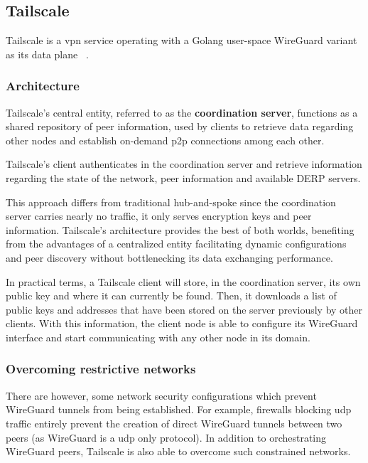 \documentclass[11pt,twoside,a4paper]{report}
\begin{document}
\subsection{Tailscale}

Tailscale is a \ac{vpn} service operating with a Golang user-space WireGuard variant as its data plane ~\cite{tailscale2020online}.

\subsubsection{Architecture}

Tailscale's central entity, referred to as the \textbf{coordination server}, functions as a shared repository of peer information, used by clients to retrieve data regarding other nodes and establish on-demand \ac{p2p} connections among each other.

Tailscale's client authenticates in the coordination server and retrieve information regarding the state of the network, peer information and available \ac{DERP} servers.

This approach differs from traditional hub-and-spoke since the coordination server carries nearly no traffic, it only serves encryption keys and peer information. Tailscale's architecture provides the best of both worlds, benefiting from the advantages of a centralized entity facilitating dynamic configurations and peer discovery without bottlenecking its data exchanging performance.

In practical terms, a Tailscale client will store, in the coordination server, its own public key and where it can currently be found. Then, it downloads a list of public keys and addresses that have been stored on the server previously by other clients. With this information, the client node is able to configure its WireGuard interface and start communicating with any other node in its domain.

\subsubsection{Overcoming restrictive networks}
\label{ssec:tsnetworks}

There are however, some network security configurations which prevent WireGuard tunnels from being established. For example, firewalls blocking \ac{udp} traffic entirely prevent the creation of direct WireGuard tunnels between two peers (as WireGuard is a \ac{udp} only protocol). In addition to orchestrating WireGuard peers, Tailscale is also able to overcome such constrained networks.
\end{document}
